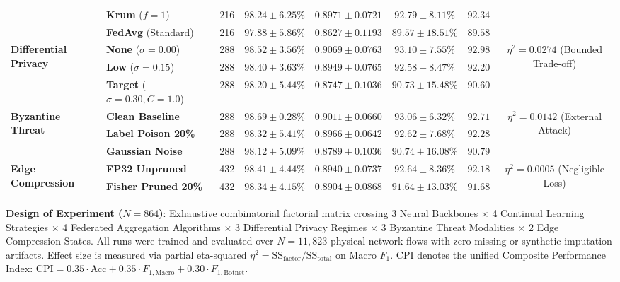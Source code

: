 \documentclass[journal,10pt,twocolumn]{IEEEtran}
\begin{document}
\begin{table}[t]
{\begin{tabular}{llcccccc}
 & \textbf{Krum} ($f=1$) & 216 & $98.24 \pm 6.25\%$ & $0.8971 \pm 0.0721$ & $92.79 \pm 8.11\%$ & $92.34$ & \\
 & \textbf{FedAvg} (Standard) & 216 & $97.88 \pm 5.86\%$ & $0.8627 \pm 0.1193$ & $89.57 \pm 18.51\%$ & $89.58$ & \\
\midrule
\multirow{3}{*}{\textbf{Differential Privacy}} 
 & \textbf{None} ($\sigma=0.00$) & 288 & $\mathbf{98.52 \pm 3.56\%}$ & $\mathbf{0.9069 \pm 0.0763}$ & $\mathbf{93.10 \pm 7.55\%}$ & $\mathbf{92.98}$ & \multirow{3}{*}{$\eta^2 = 0.0274$ (Bounded Trade-off)} \\
 & \textbf{Low} ($\sigma=0.15$) & 288 & $98.40 \pm 3.63\%$ & $0.8949 \pm 0.0765$ & $92.58 \pm 8.47\%$ & $92.20$ & \\
 & \textbf{Target} ($\sigma=0.30, C=1.0$) & 288 & $98.20 \pm 5.44\%$ & $0.8747 \pm 0.1036$ & $90.73 \pm 15.48\%$ & $90.60$ & \\
\midrule
\multirow{3}{*}{\textbf{Byzantine Threat}} 
 & \textbf{Clean Baseline} & 288 & $\mathbf{98.69 \pm 0.28\%}$ & $\mathbf{0.9011 \pm 0.0660}$ & $\mathbf{93.06 \pm 6.32\%}$ & $\mathbf{92.71}$ & \multirow{3}{*}{$\eta^2 = 0.0142$ (External Attack)} \\
 & \textbf{Label Poison 20\%} & 288 & $98.32 \pm 5.41\%$ & $0.8966 \pm 0.0642$ & $92.62 \pm 7.68\%$ & $92.28$ & \\
 & \textbf{Gaussian Noise} & 288 & $98.12 \pm 5.09\%$ & $0.8789 \pm 0.1036$ & $90.74 \pm 16.08\%$ & $90.79$ & \\
\midrule
\multirow{2}{*}{\textbf{Edge Compression}} 
 & \textbf{FP32 Unpruned} & 432 & $\mathbf{98.41 \pm 4.44\%}$ & $\mathbf{0.8940 \pm 0.0737}$ & $\mathbf{92.64 \pm 8.36\%}$ & $\mathbf{92.18}$ & \multirow{2}{*}{$\eta^2 = 0.0005$ (Negligible Loss)} \\
 & \textbf{Fisher Pruned 20\%} & 432 & $98.34 \pm 4.15\%$ & $0.8904 \pm 0.0868$ & $91.64 \pm 13.03\%$ & $91.68$ & \\
\bottomrule
\end{tabular}%
}
\vspace{1pt}
\begin{flushleft}
\scriptsize \textbf{Design of Experiment ($N=864$)}: Exhaustive combinatorial factorial matrix crossing 3 Neural Backbones $\times$ 4 Continual Learning Strategies $\times$ 4 Federated Aggregation Algorithms $\times$ 3 Differential Privacy Regimes $\times$ 3 Byzantine Threat Modalities $\times$ 2 Edge Compression States. All runs were trained and evaluated over $N=11{,}823$ physical network flows with zero missing or synthetic imputation artifacts. Effect size is measured via partial eta-squared $\eta^2 = \text{SS}_{\text{factor}} / \text{SS}_{\text{total}}$ on Macro $F_1$. CPI denotes the unified Composite Performance Index: $\text{CPI} = 0.35 \cdot \text{Acc} + 0.35 \cdot F_{1,\text{Macro}} + 0.30 \cdot F_{1,\text{Botnet}}$.
\end{flushleft}
\end{table}
\end{document}
